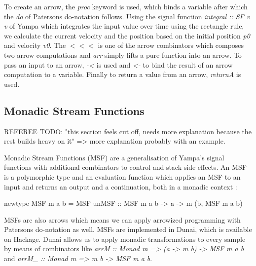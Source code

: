 To create an arrow, the \textit{proc} keyword is used, which binds a variable after which the \textit{do} of Patersons do-notation \cite{paterson_new_2001} follows. Using the signal function \textit{integral :: SF v v} of Yampa which integrates the input value over time using the rectangle rule, we calculate the current velocity and the position based on the initial position \textit{p0} and velocity \textit{v0}. The $<<<$ is one of the arrow combinators which composes two arrow computations and \textit{arr} simply lifts a pure function into an arrow. To pass an input to an arrow, \textit{-<} is used and \textit{<-} to bind the result of an arrow computation to a variable. Finally to return a value from an arrow, \textit{returnA} is used.

\subsection{Monadic Stream Functions}
REFEREE TODO: "this section feels cut off, needs more explanation because the rest builds heavy on it" => more explanation probably with an example.

Monadic Stream Functions (MSF) are a generalisation of Yampa's signal functions with additional combinators to control and stack side effects. An MSF is a polymorphic type and an evaluation function which applies an MSF to an input and returns an output and a continuation, both in a monadic context \cite{perez_functional_2016, perez_extensible_2017}:
\begin{HaskellCode}
newtype MSF m a b =
  MSF { unMSF :: MSF m a b -> a -> m (b, MSF m a b) }
\end{HaskellCode}

MSFs are also arrows which means we can apply arrowized programming with Patersons do-notation as well. MSFs are implemented in Dunai, which is available on Hackage. Dunai allows us to apply monadic transformations to every sample by means of combinators like \textit{arrM :: Monad m => (a -> m b) -> MSF m a b} and \textit{arrM\_ :: Monad m => m b -> MSF m a b}.